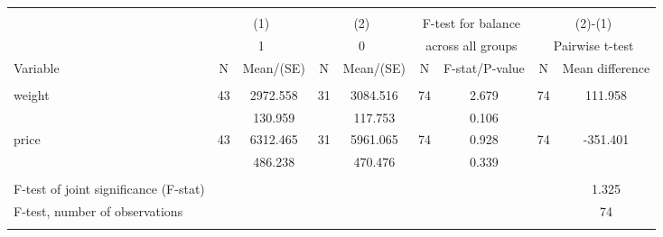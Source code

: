 \begin{tabular}{@{\extracolsep{5pt}}lcccccccc}
\\[-1.8ex]\hline \hline \\[-1.8ex]
 & \multicolumn{2}{c}{(1)}  & \multicolumn{2}{c}{(2)}  & \multicolumn{2}{c}{F-test for balance} & \multicolumn{2}{c}{(2)-(1)} \\
 & \multicolumn{2}{c}{1}  & \multicolumn{2}{c}{0}  & \multicolumn{2}{c}{across all groups} & \multicolumn{2}{c}{Pairwise t-test}  \\
Variable & N & Mean/(SE) & N & Mean/(SE) & N & F-stat/P-value & N & Mean difference \\ \hline \\[-1.8ex] 
weight   & 43    &  2972.558    & 31    &  3084.516    & 74    &     2.679    & 74    &   111.958   \\
 &   &   130.959  &   &   117.753  &   &     0.106  &   &   \\
price   & 43    &  6312.465    & 31    &  5961.065    & 74    &     0.928    & 74    &  -351.401   \\
 &   &   486.238  &   &   470.476  &   &     0.339  &   &   \\
\hline \\[-1.8ex]
F-test of joint significance (F-stat) & &   & &   & &     & &      1.325   \\
F-test, number of observations & &   & &   & &   & &  74   \\
\hline \\[-1.8ex]

\end{tabular}
